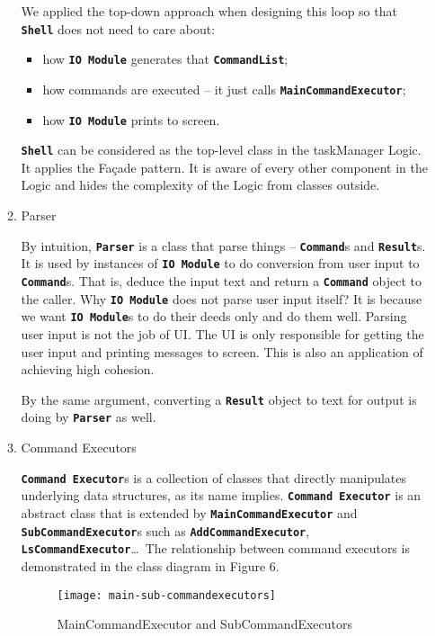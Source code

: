 \documentclass[12pt, a4paper]{article}
\newcommand{\cmdinline}[1]{{\bf \texttt{#1}}}
\begin{document}
\begin{enumerate}
\begin{enumerate}
We applied the top-down approach when designing this loop so that \cmdinline{Shell} does not need to care about:
\begin{itemize}
\item how \cmdinline{IO Module} generates that \cmdinline{CommandList};
\item how commands are executed -- it just calls \cmdinline{MainCommandExecutor};
\item how \cmdinline{IO Module} prints to screen.
\end{itemize}

\cmdinline{Shell} can be considered as the top-level class in the taskManager Logic. It applies the Fa\c cade pattern. It is aware of every other component in the Logic and hides the complexity of the Logic from classes outside.

\item Parser

By intuition, \cmdinline{Parser} is a class that parse things -- \cmdinline{Command}s and \cmdinline{Result}s. It is used by instances of \cmdinline{IO Module} to do conversion from user input to \cmdinline{Command}s. That is, deduce the input text and return a \cmdinline{Command} object to the caller.
Why \cmdinline{IO Module} does not parse user input itself? It is because we want \cmdinline{IO Module}s to do their deeds only and do them well. Parsing user input is not the job of UI. The UI is only responsible for getting the user input and printing messages to screen. This is also an application of achieving high cohesion.

By the same argument, converting a \cmdinline{Result} object to text for output is doing by \cmdinline{Parser} as well.

\item Command Executors

\cmdinline{Command Executor}s is a collection of classes that directly manipulates underlying data structures, as its
name implies. \cmdinline{Command Executor} is an abstract class that is extended by \cmdinline{MainCommandExecutor} and \cmdinline{SubCommandExecutor}s such as \cmdinline{AddCommandExecutor}, \cmdinline{LsCommandExecutor}\footnotemark\ldots \ The relationship between command executors is demonstrated in the  class diagram in Figure 6.

\begin{figure}[h]
  \centering
  \texttt{[image: main-sub-commandexecutors]}
  \caption{MainCommandExecutor and SubCommandExecutors}
\end{figure}


\end{enumerate}
\end{enumerate}
\end{document}
